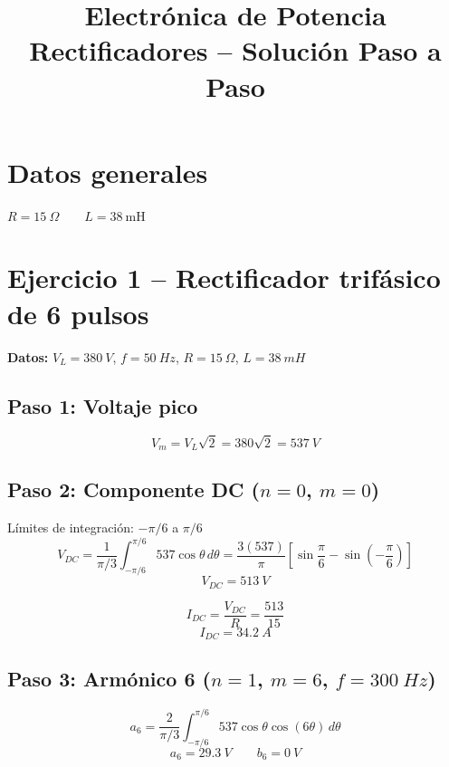 \documentclass[12pt]{article}
\title{Electrónica de Potencia \\ \large Rectificadores -- Solución Paso a Paso}
\author{}
\date{}
\begin{document}
\maketitle

\section*{Datos generales}
$R = 15\ \Omega \qquad L = 38\ \text{mH}$

\section{Ejercicio 1 -- Rectificador trifásico de 6 pulsos}

\textbf{Datos:} $V_L = 380\ V$, $f = 50\ Hz$, $R = 15\ \Omega$, $L = 38\ mH$

\subsection*{Paso 1: Voltaje pico}
\begin{equation}
V_m = V_L\sqrt{2} = 380\sqrt{2} = 537\ V
\end{equation}

\subsection*{Paso 2: Componente DC ($n=0$, $m=0$)}
Límites de integración: $-\pi/6$ a $\pi/6$
\begin{equation}
V_{DC}=\frac{1}{\pi/3}\int_{-\pi/6}^{\pi/6}537\cos\theta\,d\theta=\frac{3(537)}{\pi}\left[\sin\frac{\pi}{6}-\sin\left(-\frac{\pi}{6}\right)\right]
\end{equation}
\begin{equation}
\boxed{V_{DC}=513\ V}
\end{equation}

\begin{equation}
I_{DC}=\frac{V_{DC}}{R}=\frac{513}{15}
\end{equation}
\begin{equation}
\boxed{I_{DC}=34.2\ A}
\end{equation}

\subsection*{Paso 3: Armónico 6 ($n=1$, $m=6$, $f=300\ Hz$)}
\begin{equation}
a_6=\frac{2}{\pi/3}\int_{-\pi/6}^{\pi/6}537\cos\theta\cos(6\theta)\,d\theta
\end{equation}
\begin{equation}
\boxed{a_6=29.3\ V} \qquad \boxed{b_6=0\ V}
\end{equation}
\end{document}

